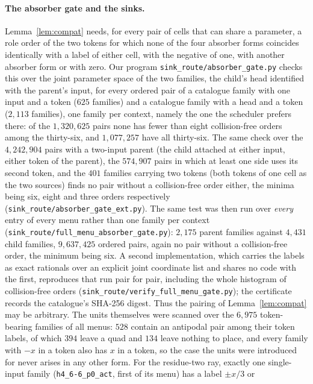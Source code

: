 \documentclass[11pt,a4paper]{article}
\theoremstyle{plain}
\theoremstyle{definition}
\theoremstyle{remark}
\newcommand{\file}[1]{\texttt{#1}}
\begin{document}
\paragraph{The absorber gate and the sinks.}
Lemma~\ref{lem:compat} needs, for every pair of cells that can share a
parameter, a role order of the two tokens for which none of the four absorber
forms coincides identically with a label of either cell, with the negative of
one, with another absorber form or with zero.  Our program
\file{sink\_route/absorber\_gate.py} checks this over the joint parameter space
of the two families, the child's head identified with the parent's input, for
every ordered pair of a catalogue family with one input and a token ($625$
families) and a catalogue family with a head and a token ($2{,}113$ families),
one family per context, namely the one the scheduler prefers there:
of the $1{,}320{,}625$ pairs none has fewer than eight collision-free orders
among the thirty-six, and $1{,}077{,}257$ have all thirty-six.  The same check
over the $4{,}242{,}904$ pairs with a two-input parent (the child attached at
either input, either token of the parent), the $574{,}907$ pairs in which at
least one side uses its second token, and the $401$ families carrying two
tokens (both tokens of one cell as the two sources) finds no pair without a
collision-free order either, the minima being six, eight and three orders
respectively (\file{sink\_route/absorber\_gate\_ext.py}).  The same test was
then run over \emph{every} entry of every menu rather than one family per
context (\file{sink\_route/full\_menu\_absorber\_gate.py}): $2{,}175$ parent
families against $4{,}431$ child families, $9{,}637{,}425$ ordered pairs, again
no pair without a collision-free order, the minimum being six.  A second
implementation, which carries the labels as exact rationals over an explicit
joint coordinate list and shares no code with the first, reproduces that run
pair for pair, including the whole histogram of collision-free orders
(\file{sink\_route/verify\_full\_menu\_gate.py}); the certificate records the
catalogue's SHA-256 digest.  Thus the pairing of
Lemma~\ref{lem:compat} may be arbitrary.  The units themselves were scanned
over the $6{,}975$ token-bearing families of all menus: $528$ contain an
antipodal pair among their token labels, of which $394$ leave a quad and
$134$ leave nothing to place, and every family with $-x$ in a token also has
$x$ in a token, so the case the units were introduced for never arises in
any other form.
For the residue-two ray, exactly one single-input family
(\texttt{h4\_6-6\_p0\_act}, first of its menu) has a label $\pm x/3$ or
\end{document}
